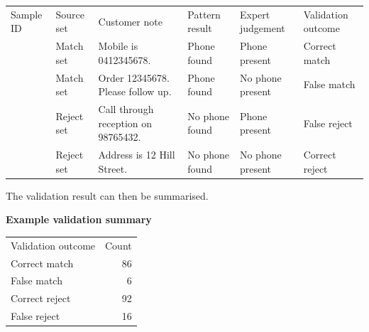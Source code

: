 \documentclass[10pt,openany,10pt]{book}
\newcounter{none}
\let\podeToprule\toprule
\let\podeMidrule\midrule
\let\podeBottomrule\bottomrule
\renewcommand{\toprule}{\arrayrulecolor{pbiGrid}\podeToprule}
\renewcommand{\midrule}{\arrayrulecolor{pbiGrid}\podeMidrule}
\renewcommand{\bottomrule}{\arrayrulecolor{pbiGrid}\podeBottomrule}
\begin{document}
{\def\LTcaptype{none} %
\begin{longtable}[]{@{}
  >{\raggedleft\arraybackslash}p{}
  >{\raggedright\arraybackslash}p{}
  >{\raggedright\arraybackslash}p{}
  >{\raggedright\arraybackslash}p{}
  >{\raggedright\arraybackslash}p{}
  >{\raggedright\arraybackslash}p{}@{}}
\toprule\noalign{}
\begin{minipage}[b]{\linewidth}\raggedleft
Sample ID
\end{minipage} & \begin{minipage}[b]{\linewidth}\raggedright
Source set
\end{minipage} & \begin{minipage}[b]{\linewidth}\raggedright
Customer note
\end{minipage} & \begin{minipage}[b]{\linewidth}\raggedright
Pattern result
\end{minipage} & \begin{minipage}[b]{\linewidth}\raggedright
Expert judgement
\end{minipage} & \begin{minipage}[b]{\linewidth}\raggedright
Validation outcome
\end{minipage} \\
\midrule\noalign{}
\endhead
\bottomrule\noalign{}
\endlastfoot
1 & Match set & Mobile is 0412345678. & Phone found & Phone present &
Correct match \\
2 & Match set & Order 12345678. Please follow up. & Phone found & No
phone present & False match \\
3 & Reject set & Call through reception on 98765432. & No phone found &
Phone present & False reject \\
4 & Reject set & Address is 12 Hill Street. & No phone found & No phone
present & Correct reject \\
\end{longtable}
}

The validation result can then be summarised.

\textbf{Example validation summary}

{\def\LTcaptype{none} %
\begin{longtable}[]{@{}lr@{}}
\toprule\noalign{}
Validation outcome & Count \\
\midrule\noalign{}
\endhead
\bottomrule\noalign{}
\endlastfoot
Correct match & 86 \\
False match & 6 \\
Correct reject & 92 \\
False reject & 16 \\
\end{longtable}
}
\end{document}
